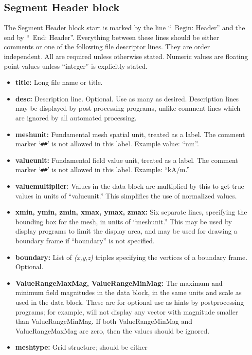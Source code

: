 \subsection{Segment Header block}\label{sec:ovfsegmentheader}
The Segment Header block start is marked by the line
``\lb~Begin: Header'' and the end by ``\lb~End: Header''.  Everything
between these lines should be either comments or one of the following
file descriptor lines.  They are order independent.  All are required
unless otherwise stated.  Numeric values are floating point values
unless ``integer'' is explicitly stated.
\begin{itemize}
\item {\bf title:} Long file name or title.
\item {\bf desc:} Description line.  Optional.  Use as many as desired.
   Description lines may be displayed by post-processing programs,
   unlike comment lines which are ignored by all automated processing.
\item {\bf meshunit:} Fundamental mesh spatial unit, treated as a
   label.  The comment marker `\verb+##+' is not allowed in this label.
   Example value: ``nm''.
\item {\bf valueunit:} Fundamental field value unit, treated as a
   label.  The comment marker `\verb+##+' is not allowed in this label.
   Example: ``kA/m.''
\item {\bf valuemultiplier:} Values in the data block are multiplied by
   this to get true values in units of ``valueunit.''  This simplifies
   the use of normalized values.
\item {\bf xmin, ymin, zmin, xmax, ymax, zmax:} Six separate lines,
   specifying the bounding box for the mesh, in units of ``meshunit.''
   This may be used by display programs to limit the display area,
   and may be used for drawing a boundary frame if ``boundary'' is not
   specified.
\item {\bf boundary:} List of {\it (x,y,z)} triples specifying the
   vertices of a boundary frame.  Optional.
\item {\bf ValueRangeMaxMag, ValueRangeMinMag:}  The maximum and
   minimum field magnitudes in the data block, in the same
   units and scale as used in the data block.  These are for optional
   use as hints by postprocessing programs; for example, 
   will not display any vector with magnitude smaller than
   ValueRangeMinMag.  If both ValueRangeMinMag and ValueRangeMaxMag
   are zero, then the values should be ignored.
\item {\bf meshtype:} Grid structure; should be either

\end{itemize}
